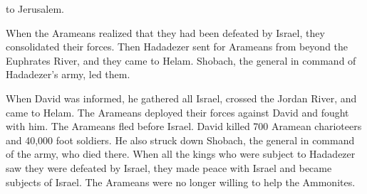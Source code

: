 {to Jerusalem.
\par }{\PP {}When
the Arameans
realized that
they had been defeated
by
Israel,
they consolidated
their forces.
Then Hadadezer
sent
for Arameans
from beyond
the Euphrates River,
and they came
to Helam.
Shobach,
the general in command
of Hadadezer’s
army,
led them.
\par }{\PP {}When David
was informed,
he gathered
all
Israel,
crossed
the Jordan River,
and came
to Helam.
The Arameans
deployed
their forces against
David
and fought
with him.
The Arameans
fled
before
Israel.
David
killed
700
Aramean
charioteers
and 40,000
foot soldiers.
He also struck down
Shobach,
the general
in command of the army,
who died
there.
When
all
the kings
who were subject
to Hadadezer
saw they were defeated
by Israel,
they made peace
with
Israel
and became subjects
of Israel. The Arameans
were no longer
willing to help
the
Ammonites.

}
